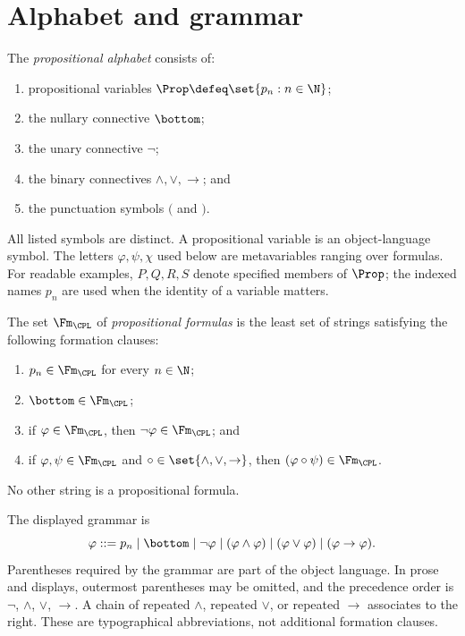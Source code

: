 \section{Alphabet and grammar}
\label{sec:prop-syntax-semantics-01}

\begin{definition}
The \emph{propositional alphabet} consists of:
\begin{enumerate}
  \item propositional variables
        \(\Prop\defeq\set{p_n:n\in\N}\);
  \item the nullary connective \(\bottom\);
  \item the unary connective \(\neg\);
  \item the binary connectives \(\land,\lor,\to\); and
  \item the punctuation symbols \((\) and \()\).
\end{enumerate}
All listed symbols are distinct.  A propositional variable is an
object-language symbol.  The letters \(\varphi,\psi,\chi\) used below are
metavariables ranging over formulas.  For readable examples, \(P,Q,R,S\)
denote specified members of \(\Prop\); the indexed names \(p_n\) are used when
the identity of a variable matters.
\end{definition}

\begin{definition}
The set \(\Fm_{\CPL}\) of \emph{propositional formulas} is the least set of
strings satisfying the following formation clauses:
\begin{enumerate}
  \item \(p_n\in\Fm_{\CPL}\) for every \(n\in\N\);
  \item \(\bottom\in\Fm_{\CPL}\);
  \item if \(\varphi\in\Fm_{\CPL}\), then
        \(\neg\varphi\in\Fm_{\CPL}\); and
  \item if \(\varphi,\psi\in\Fm_{\CPL}\) and
        \(\circ\in\set{\land,\lor,\to}\), then
        \((\varphi\circ\psi)\in\Fm_{\CPL}\).
\end{enumerate}
No other string is a propositional formula.
\end{definition}

The displayed grammar is
\[
  \varphi ::= p_n\mid\bottom\mid\neg\varphi
  \mid(\varphi\land\varphi)\mid(\varphi\lor\varphi)
  \mid(\varphi\to\varphi).
\]
Parentheses required by the grammar are part of the object language.  In prose
and displays, outermost parentheses may be omitted, and the precedence order
is \(\neg\), \(\land\), \(\lor\), \(\to\).  A chain of repeated
\(\land\), repeated \(\lor\), or repeated \(\to\) associates to the right.
These are typographical abbreviations, not additional formation clauses.

